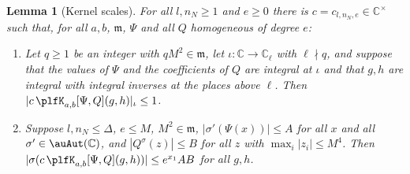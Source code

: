 \documentclass[10pt]{amsart}
\newtheorem{lemma}[theorem]{Lemma}
\theoremstyle{definition}
\theoremstyle{remark}
\newcommand{\C}{\mathbb C}
\begin{document}
\begin{lemma}[Kernel scales]\label{plf:KS}
For all $l,n_N\ge1$ and $e\ge0$ there is $c=c_{l,n_N,e}\in\C^\times$ such that, for all $a,b$,
$\mathfrak m$, $\Psi$ and all $Q$ homogeneous of degree $e$:
\begin{enumerate}
\item[(KS1)] Let $q\ge1$ be an integer with $qM^2\in\mathfrak m$, let $\iota\colon\C\to\C_\ell$ with
$\ell\nmid q$, and suppose that the values of $\Psi$ and the coefficients of $Q$ are integral at
$\iota$ and that $g,h$ are integral with integral inverses at the places above $\ell$. Then
$|c\,\plfK_{a,b}[\Psi,Q](g,h)|_\iota\le1$.
\item[(KS2)] Suppose $l,n_N\le\Delta$, $e\le M$, $M^2\in\mathfrak m$, $|\sigma'(\Psi(x))|\le A$ for all
$x$ and all $\sigma'\in\auAut(\C)$, and $|Q^\sigma(z)|\le B$ for all $z$ with $\max_i|z_i|\le M^4$.
Then $|\sigma(c\,\plfK_{a,b}[\Psi,Q](g,h))|\le e^{x_1}AB$ for all $g,h$.
\end{enumerate}
\end{lemma}
\end{document}
